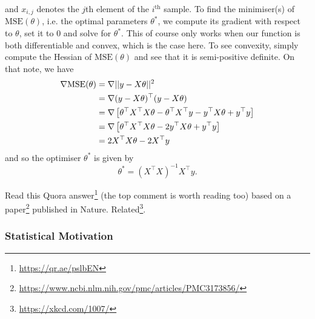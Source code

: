 \documentclass[11pt]{article}
\begin{document}
and $x_{i,j}$ denotes the $j$th element of the $i^{\text{th}}$ sample. To find the minimiser(s) of $\text{MSE}(\theta)$, i.e. the optimal parameters $\theta^{*}$, we compute its gradient with respect to $\theta$, set it to $0$ and solve for $\theta^{*}$. This of course only works when our function is both differentiable and convex, which is the case here. To see convexity, simply compute the Hessian of $\text{MSE}(\theta)$ and see that it is semi-positive definite. On that note, we have
\begin{align*}
    \nabla\text{MSE}(\theta)
    &=
    \nabla||y-X\theta||^2\\
    &=
    \nabla(y-X\theta)^{\top}(y-X\theta)\\
    &=
    \nabla\left[\theta^{\top}X^{\top}X\theta-\theta^{\top}X^{\top}y-y^{\top}X\theta+y^{\top}y\right]\\
    &=
    \nabla\left[\theta^{\top}X^{\top}X\theta-2y^{\top}X\theta+y^{\top}y\right]\\
    &=
    2X^{\top}X\theta-2X^{\top}y
\end{align*}
and so the optimiser $\theta^{*}$ is given by
$$
\theta^{*}=(X^{\top}X)^{-1}X^{\top}y.
$$

\begin{tcolorbox}[title={\textbf{Funny misuse of linear regression: Momentous sprint at the 2156 Olympics?}}, colback=myLightBlue, colbacktitle=myDarkBlue, colframe=myDarkBlue, coltitle=white]
    Read this Quora answer\footnote{\url{https://qr.ae/pslbEN}} (the top comment is worth reading too) based on a paper\footnote{\url{https://www.ncbi.nlm.nih.gov/pmc/articles/PMC3173856/}} published in Nature. Related\footnote{\url{https://xkcd.com/1007/}}.
\end{tcolorbox}

\subsubsection{Statistical Motivation}
\end{document}
